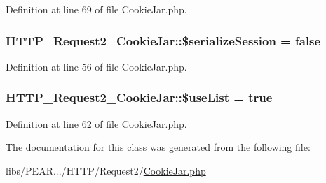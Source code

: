 Definition at line 69 of file Cookie\+Jar.\+php.

\subsubsection[{\texorpdfstring{\$serialize\+Session}{$serializeSession}}]{\setlength{\rightskip}{0pt plus 5cm}H\+T\+T\+P\+\_\+\+Request2\+\_\+\+Cookie\+Jar\+::\$serialize\+Session = false\hspace{0.3cm}{\ttfamily [protected]}}\hypertarget{classHTTP__Request2__CookieJar_ae5e881693fdcfe8cdc23966be0d8a218}{}\label{classHTTP__Request2__CookieJar_ae5e881693fdcfe8cdc23966be0d8a218}


Definition at line 56 of file Cookie\+Jar.\+php.

\subsubsection[{\texorpdfstring{\$use\+List}{$useList}}]{\setlength{\rightskip}{0pt plus 5cm}H\+T\+T\+P\+\_\+\+Request2\+\_\+\+Cookie\+Jar\+::\$use\+List = true\hspace{0.3cm}{\ttfamily [protected]}}\hypertarget{classHTTP__Request2__CookieJar_a931db790fefc72638f7220fc45f16a55}{}\label{classHTTP__Request2__CookieJar_a931db790fefc72638f7220fc45f16a55}


Definition at line 62 of file Cookie\+Jar.\+php.



The documentation for this class was generated from the following file\+:\begin{DoxyCompactItemize}
\item 
libs/\+P\+E\+A\+R.../\+H\+T\+T\+P/\+Request2/\hyperlink{CookieJar_8php}{Cookie\+Jar.\+php}\end{DoxyCompactItemize}
